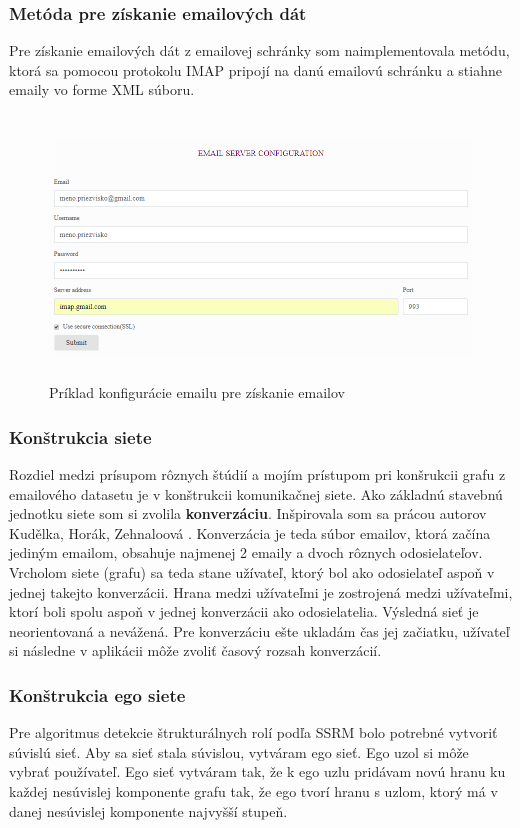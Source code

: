 \documentclass[slovak,master,public,dept460,male,cpdeclaration,oneside]{diploma}
\begin{document}
\subsubsection{Metóda pre získanie emailových dát}
Pre získanie emailových dát z emailovej schránky som naimplementovala metódu, ktorá sa pomocou protokolu IMAP pripojí na danú emailovú schránku a stiahne emaily vo forme XML súboru. 

\begin{figure}[H]
\centering
\includegraphics[width=15cm, height=7cm]{figures/konfiguracia_emailu}
\caption{Príklad konfigurácie emailu pre získanie emailov}
\end{figure}


\subsubsection{Konštrukcia siete}

Rozdiel medzi prísupom rôznych štúdií a mojím prístupom pri konšrukcii grafu z emailového datasetu je v konštrukcii komunikačnej siete. Ako základnú stavebnú jednotku siete som si zvolila \textbf{konverzáciu}. Inšpirovala som sa prácou autorov Kudělka, Horák, Zehnaloová \cite{10}. Konverzácia je teda súbor emailov, ktorá začína jediným emailom, obsahuje najmenej 2 emaily a dvoch rôznych odosielateľov. Vrcholom siete (grafu) sa teda stane užívateľ, ktorý bol ako odosielateľ aspoň v jednej takejto konverzácii. Hrana medzi užívateľmi je zostrojená medzi užívateľmi, ktorí boli spolu aspoň v jednej konverzácii ako odosielatelia. Výsledná sieť je neorientovaná a nevážená. Pre konverzáciu ešte ukladám čas jej začiatku, užívateľ si následne v aplikácii môže zvoliť časový rozsah konverzácií. 


\subsubsection{Konštrukcia ego siete}
Pre algoritmus detekcie štrukturálnych rolí podľa SSRM bolo potrebné vytvoriť súvislú sieť. Aby sa sieť stala súvislou, vytváram ego sieť. Ego uzol si môže vybrať používateľ. Ego sieť vytváram tak, že k ego uzlu pridávam novú hranu ku každej nesúvislej komponente grafu tak, že ego tvorí hranu s uzlom, ktorý má v danej nesúvislej komponente najvyšší stupeň.
\end{document}
